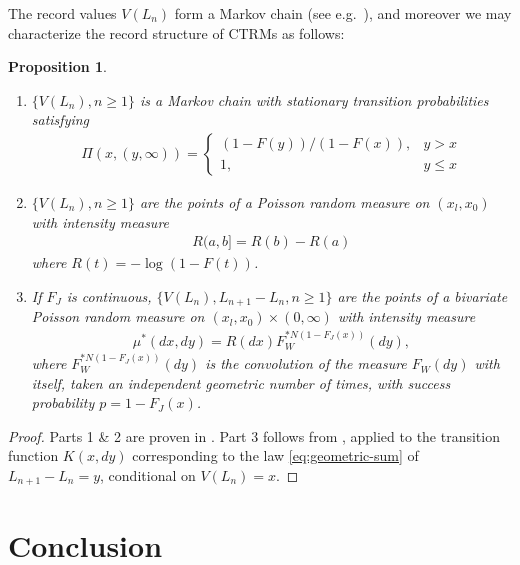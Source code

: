 \documentclass[12pt]{article}
\newtheorem{proposition}[equation]{Proposition}
\newcommand{\1}{\mathbf 1}
\begin{document}
The record values $V(L_n)$ form a Markov chain (see e.g.\ \cite{resnick2013extreme}), and moreover we may characterize the record structure of CTRMs as follows: 

\begin{proposition}
\begin{enumerate}
\item
$\{V(L_n), n \ge 1\}$ is a Markov chain with stationary transition probabilities satisfying
\begin{align*}
\Pi(x, (y,\infty)) = 
\begin{cases}
(1-F(y)) / (1-F(x)), & y > x
\\
1, & y \le x
\end{cases}
\end{align*}
\item
$\{V(L_n), n \ge 1\}$ are the points of a Poisson random measure on $(x_l, x_0)$ with intensity measure
\begin{align*}
R(a,b] = R(b) - R(a)
\end{align*}
where $R(t) = -\log(1-F(t))$. 
\item
If $F_J$ is continuous, $\{V(L_n), L_{n+1} - L_n, n \ge 1\}$ are the points of a bivariate Poisson random measure on
$(x_l, x_0) \times (0,\infty)$ with intensity measure
\begin{align*}
\mu^*(dx, dy) = R(dx) F_W^{*N(1-F_J(x))}(dy),
\end{align*}
where $F_W^{*N(1-F_J(x))}(dy)$ is the convolution of the measure $F_W(dy)$ with itself, taken an independent geometric number of times, with success probability $p = 1-F_J(x)$.
\end{enumerate}
\end{proposition}

\begin{proof}
Parts 1 \& 2 are proven in 
\cite[Proposition 4.1 (i) \& (iii)]{resnick2013extreme}.
Part 3 follows from \cite[Proposition 3.8]{resnick2013extreme}, 
applied to the transition function $K(x,dy)$ corresponding to the law \eqref{eq:geometric-sum} of $L_{n+1} - L_n = y$, conditional on $V(L_n) = x$. 
\end{proof}









\section{Conclusion}
\end{document}
